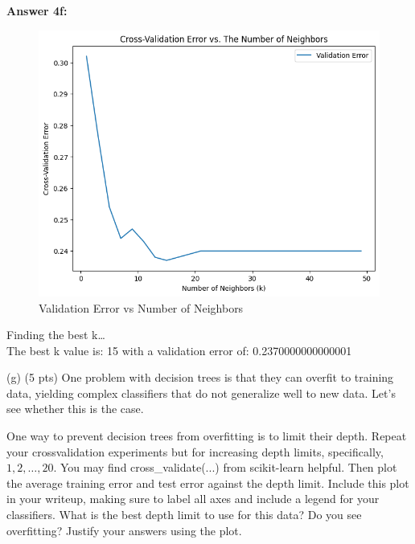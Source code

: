 \documentclass[10pt]{article}
\begin{document}
\begin{flushleft}

\textbf{Answer 4f:} \\

\begin{figure}[H]
\centering
\includegraphics[width=1\textwidth]{images/error_vs_neighbor.png}
\caption{Validation Error vs Number of Neighbors}
\label{fig:Error}
\end{figure}

Finding the best k… \\
The best k value is: 15 with a validation error of: 0.2370000000000001 \\

    
\end{flushleft}

(g) (5 pts) One problem with decision trees is that they can overfit to training data, yielding complex classifiers that do not generalize well to new data. Let's see whether this is the case.

One way to prevent decision trees from overfitting is to limit their depth. Repeat your crossvalidation experiments but for increasing depth limits, specifically, $1,2, \ldots, 20$. You may find cross\_validate(...) from scikit-learn helpful. Then plot the average training error and test error against the depth limit. Include this plot in your writeup, making sure to label all axes and include a legend for your classifiers. What is the best depth limit to use for this data? Do you see overfitting? Justify your answers using the plot.
\end{document}
